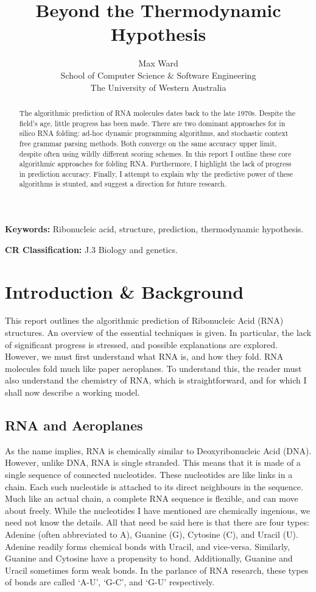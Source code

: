 \documentclass[12pt, a4paper]{article}
\title{Beyond the Thermodynamic Hypothesis}
\author{Max Ward \\
School of Computer Science \& Software Engineering \\
The University of Western Australia}
\begin{document}
\maketitle

\begin{abstract}
The algorithmic prediction of RNA molecules dates back to the late 1970s. Despite the field's age, little progress has been made. There are two dominant approaches for in silico RNA folding: ad-hoc dynamic programming algorithms, and stochastic context free grammar parsing methods. Both converge on the same accuracy upper limit, despite often using wildly different scoring schemes. In this report I outline these core algorithmic approaches for folding RNA. Furthermore, I highlight the lack of progress in prediction accuracy. Finally, I attempt to explain why the predictive power of these algorithms is stunted, and suggest a direction for future research.
\end{abstract}


{\bf Keywords:} Ribonucleic acid, structure, prediction, thermodynamic hypothesis.

{\bf CR Classification:} J.3 Biology and genetics.

\clearpage


\section{Introduction \& Background}
This report outlines the algorithmic prediction of Ribonucleic Acid (RNA) structures. An overview of the essential techniques is given. In particular, the lack of significant progress is stressed, and possible explanations are explored. However, we must first understand what RNA is, and how they fold. RNA molecules fold much like paper aeroplanes. To understand this, the reader must also understand the chemistry of RNA, which is straightforward, and for which I shall now describe a working model.

\subsection{RNA and Aeroplanes} 
As the name implies, RNA is chemically similar to Deoxyribonucleic Acid (DNA). However, unlike DNA, RNA is single stranded. This means that it is made of a single sequence of connected nucleotides. These nucleotides are like links in a chain. Each such nucleotide is attached to its direct neighbours in the sequence. Much like an actual chain, a complete RNA sequence is flexible, and can move about freely. While the nucleotides I have mentioned are chemically ingenious, we need not know the details. All that need be said here is that there are four types: Adenine (often abbreviated to A), Guanine (G), Cytosine (C), and Uracil (U). Adenine readily forms chemical bonds with Uracil, and vice-versa. Similarly, Guanine and Cytosine have a propensity to bond. Additionally, Guanine and Uracil sometimes form weak bonds. In the parlance of RNA research, these types of bonds are called `A-U', `G-C', and `G-U' respectively.
\end{document}
